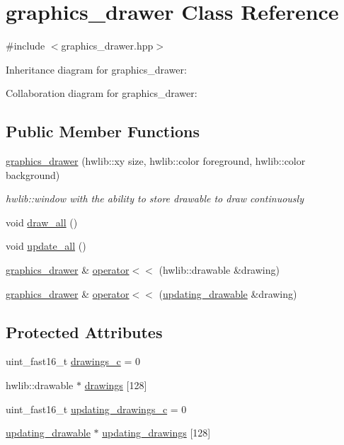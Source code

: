 \hypertarget{classgraphics__drawer}{}\section{graphics\+\_\+drawer Class Reference}
\label{classgraphics__drawer}


{\ttfamily \#include $<$graphics\+\_\+drawer.\+hpp$>$}



Inheritance diagram for graphics\+\_\+drawer\+:


Collaboration diagram for graphics\+\_\+drawer\+:
\subsection*{Public Member Functions}
\begin{DoxyCompactItemize}
\item 
\hyperlink{classgraphics__drawer_a76168c68029e863f1ad09b5dc558719e}{graphics\+\_\+drawer} (hwlib\+::xy size, hwlib\+::color foreground, hwlib\+::color background)
\begin{DoxyCompactList}\small\item\em hwlib\+::window with the ability to store drawable to draw continuously \end{DoxyCompactList}\item 
void \hyperlink{classgraphics__drawer_a6c14eee0dd24900ba8aa924034b1bc60}{draw\+\_\+all} ()
\item 
void \hyperlink{classgraphics__drawer_ac85a6dc3e0ef97fc793f91862e794c47}{update\+\_\+all} ()
\item 
\hyperlink{classgraphics__drawer}{graphics\+\_\+drawer} \& \hyperlink{classgraphics__drawer_a44a2871ef32f5b9acccd7bac7d1137dd}{operator$<$$<$} (hwlib\+::drawable \&drawing)
\item 
\hyperlink{classgraphics__drawer}{graphics\+\_\+drawer} \& \hyperlink{classgraphics__drawer_a034d8e5bff49f5f18d17eb4d581712f2}{operator$<$$<$} (\hyperlink{classupdating__drawable}{updating\+\_\+drawable} \&drawing)
\end{DoxyCompactItemize}
\subsection*{Protected Attributes}
\begin{DoxyCompactItemize}
\item 
uint\+\_\+fast16\+\_\+t \hyperlink{classgraphics__drawer_a432b568a14d6ce8b746dcce5901714dd}{drawings\+\_\+c} = 0
\item 
hwlib\+::drawable $\ast$ \hyperlink{classgraphics__drawer_ae6341a415f308d7d276d6c36336f2888}{drawings} \mbox{[}128\mbox{]}
\item 
uint\+\_\+fast16\+\_\+t \hyperlink{classgraphics__drawer_a2bdb91885928251f6c0d0c94593e2200}{updating\+\_\+drawings\+\_\+c} = 0
\item 
\hyperlink{classupdating__drawable}{updating\+\_\+drawable} $\ast$ \hyperlink{classgraphics__drawer_a596f6deb608444d694f8c97bf949d7e0}{updating\+\_\+drawings} \mbox{[}128\mbox{]}
\end{DoxyCompactItemize}


